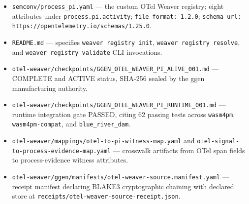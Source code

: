 \begin{itemize}
  \item \texttt{semconv/process\_pi.yaml} --- the custom OTel Weaver registry; eight attributes
        under \texttt{process.pi.activity}; \texttt{file\_format: 1.2.0};
        \texttt{schema\_url: https://opentelemetry.io/schemas/1.25.0}.
  \item \texttt{README.md} --- specifies \texttt{weaver registry init},
        \texttt{weaver registry resolve}, and \texttt{weaver registry validate} CLI invocations.
  \item \texttt{otel-weaver/checkpoints/GGEN\_OTEL\_WEAVER\_PI\_ALIVE\_001.md} --- COMPLETE and
        ACTIVE status, SHA-256 sealed by the ggen manufacturing authority.
  \item \texttt{otel-weaver/checkpoints/GGEN\_OTEL\_WEAVER\_PI\_RUNTIME\_001.md} --- runtime
        integration gate PASSED, citing 62 passing tests across \texttt{wasm4pm},
        \texttt{wasm4pm-compat}, and \texttt{blue\_river\_dam}.
  \item \texttt{otel-weaver/mappings/otel-to-pi-witness-map.yaml} and
        \texttt{otel-signal-to-process-evidence-map.yaml} --- crosswalk artifacts from OTel span
        fields to process-evidence witness attributes.
  \item \texttt{otel-weaver/ggen/manifests/otel-weaver-source.manifest.yaml} --- receipt manifest
        declaring BLAKE3 cryptographic chaining with declared store at
        \texttt{receipts/otel-weaver-source-receipt.json}.
\end{itemize}
